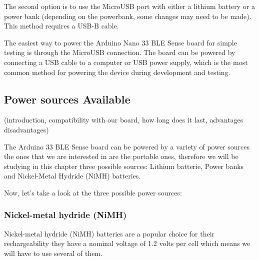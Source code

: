 The second option is to use the MicroUSB port with either a lithium battery or a power bank (depending on the powerbank, some changes may need to be made). This method requires a USB-B cable. \medskip


The easiest way to power the Arduino Nano 33 BLE Sense board for simple testing is through the MicroUSB connection. The board can be powered by connecting a USB cable to a computer or USB power supply, which is the most common method for powering the device during development and testing.

\subsection{Power sources Available}

(introduction, compatibility with our board, how long does it last, advantages disadvantages)

The Arduino 33 BLE Sense board can be powered by a variety of power sources the ones that we are interested in are the portable ones, therefore we will be studying in this chapter three possible sources:  
Lithium batterie, Power banks and Nickel-Metal Hydride (NiMH) batteries. 

%
%

Now, let's take a look at the three possible power sources:


\subsubsection{Nickel-metal hydride (NiMH)}
Nickel-metal hydride (NiMH) batteries are a popular choice for their rechargeability they have a nominal voltage of 1.2 volts per cell which means we will have to use several of them. 

